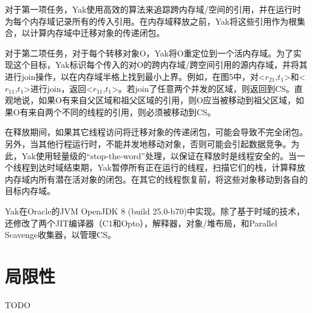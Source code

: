 对于第一项任务，Yak使用高效的算法来追踪跨内存域/空间的引用，并在运行时为每个内存域记录所有的传入引用。在内存域释放之前，Yak将这些引用作为根集合，以计算内存域中迁移对象的传递闭包。

对于第二项任务，对于每个转移对象O，Yak将O重定位到一个活内存域。为了实现这个目标，Yak标识每个传入的对O的跨内存域/跨空间引用的源内存域，并将其进行join操作，以在内存域半格上找到最小上界。例如，在图5中，对<$r_{21}$,$t_1$>和<$r_{11}$,$t_1$>进行join，返回<$r_{11}$,$t_1$>。若join了任意两个并发的区域，则返回到CS。直观地说，如果O有来自父区域和祖父区域的引用，则O应当被移动到祖父区域，如果O有来自两个不同的线程的引用，则必须被移动到CS。

在释放期间，如果其它线程访问将迁移对象的传递闭包，可能会导致不完全闭包。另外，当其他行程运行时，不能并发地移动对象，否则可能会引起数据竞争。为此，Yak使用轻量级的“stop-the-word”处理，以保证在释放时是线程安全的。当一个线程到达时域结束期，Yak暂停所有正在运行的线程，扫描它们的栈，计算释放内存域内所有潜在活对象的闭包。在其它的线程恢复前，将这些对象移动到各自的目标内存域。

Yak在Oracle的JVM OpenJDK 8 (build 25.0-b70)中实现。除了基于时域的技术，还修改了两个JIT编译器（C1和Opto），解释器，对象/堆布局，和Parallel Scavenge收集器，以管理CS。




\section{局限性}
TODO
